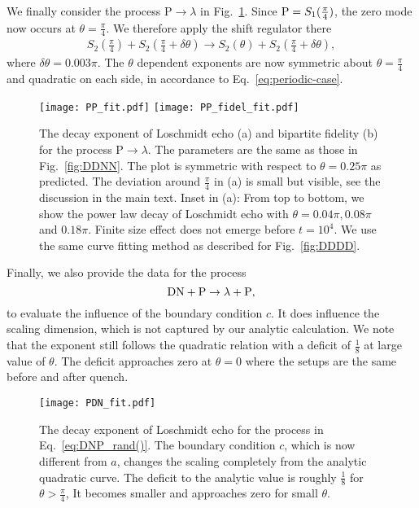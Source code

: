 We finally consider the process $\text{P} \rightarrow \lambda$
in Fig.~\ref{fig:PPPP}. Since ${\rm P} = S_1( \frac{\pi}{4} ) $, the zero mode now occurs at $\theta = \frac{\pi}{4}$. We therefore apply the shift regulator there 
\begin{equation}
\begin{aligned}
\label{eq:approx_PPPP}
S_2\left(\frac{\pi}{4}\right)+S_2\left(\frac{\pi}{4}+\delta\theta\right)\rightarrow S_2(\theta)+S_2\left(\frac{\pi}{4}+\delta\theta\right),
\end{aligned}
\end{equation}
where $\delta\theta=0.003\pi$. The $\theta$ dependent exponents are now symmetric about $\theta=\frac{\pi}{4}$ and quadratic on each side, in accordance to Eq.~\eqref{eq:periodic-case}.

\begin{figure}
  \centering
  \texttt{[image: PP\_fit.pdf]}
    \texttt{[image: PP\_fidel\_fit.pdf]}
    \caption{The decay exponent of Loschmidt echo (a) and bipartite fidelity (b) for the process $\text{P} \rightarrow \lambda${\iffalse in Eq.~\eqref{eq:PP}\fi}. The parameters are the same as those in Fig.~\ref{fig:DDNN}. The plot is symmetric with respect to $\theta=0.25\pi$ as predicted. The deviation around $\frac{\pi}{4}$ in (a) is small but visible, see the discussion in the main text. Inset in (a): From top to bottom, we show the power law decay of Loschmidt echo with $\theta=0.04\pi, 0.08\pi $ and $0.18\pi$. Finite size effect does not emerge before $t=10^{4}$. We use the same curve fitting method as described for Fig.~\ref{fig:DDDD}.}
    \label{fig:PPPP}
\end{figure}

Finally, we also provide the data for the process
\begin{equation}
\label{eq:DNP_rand()}
{\rm DN} + {\rm P} \rightarrow \lambda  + {\rm P},
\end{equation}
to evaluate the influence of the boundary condition $c$. It {\rm does} influence the scaling dimension, which is not captured by our analytic calculation. We note that the exponent still follows the quadratic relation with a deficit of $\frac{1}{8}$ at large value of $\theta$. The deficit approaches zero at $\theta=0$ where the setups are the same before and after quench.
\begin{figure}[htb]
\centering
\texttt{[image: PDN\_fit.pdf]}
\caption{The decay exponent of Loschmidt echo for the process in Eq.~\eqref{eq:DNP_rand()}. The boundary condition $c$, which is now different from $a$, changes the scaling completely from the analytic quadratic curve. The deficit to the analytic value is roughly $\frac{1}{8}$ for $\theta > \frac{\pi}{4}$, It becomes smaller and approaches zero for small $\theta$. }
\label{fig:PDN_fit}
\end{figure}

